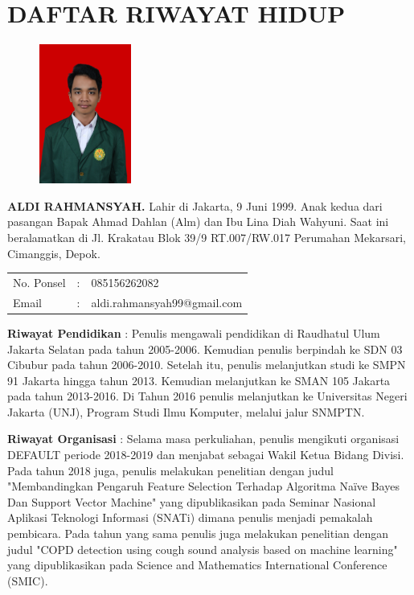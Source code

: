 \pagestyle{empty}
\chapter*{\centering \large DAFTAR RIWAYAT HIDUP}
\thispagestyle{empty}

\begin{figure}
	\vspace{-25pt}
	\begin{center}
		\includegraphics[width=0.27\textwidth]{gambar/12}
	\end{center}
	\vspace{-80pt}
\end{figure}

\noindent \textbf{ALDI RAHMANSYAH.}  Lahir di Jakarta, 9 Juni 1999.  Anak kedua dari pasangan Bapak Ahmad Dahlan (Alm) dan Ibu Lina Diah Wahyuni. Saat ini beralamatkan di Jl. Krakatau Blok 39/9 RT.007/RW.017 Perumahan Mekarsari, Cimanggis, Depok.

\vspace{0.5cm}
\noindent
\begin{center}
	\begin{flushright}
		\begin{tabular}{lcl}
			No. Ponsel	& :&  085156262082 \\
			Email	& :&  aldi.rahmansyah99@gmail.com
		\end{tabular}
	\end{flushright}
\end{center}
\vspace{0.5cm}

\noindent \textbf{Riwayat Pendidikan} : Penulis mengawali pendidikan di Raudhatul Ulum Jakarta Selatan pada tahun 2005-2006. Kemudian penulis berpindah ke SDN 03 Cibubur pada tahun 2006-2010. Setelah itu, penulis melanjutkan studi ke SMPN 91 Jakarta hingga tahun 2013. Kemudian melanjutkan ke SMAN 105 Jakarta pada tahun 2013-2016. Di Tahun 2016 penulis melanjutkan ke Universitas Negeri Jakarta (UNJ), Program Studi Ilmu Komputer, melalui jalur SNMPTN.

\noindent \textbf{Riwayat Organisasi} : Selama masa perkuliahan, penulis mengikuti organisasi DEFAULT periode 2018-2019 dan menjabat sebagai Wakil Ketua Bidang Divisi. Pada tahun 2018 juga, penulis melakukan penelitian dengan judul "Membandingkan Pengaruh Feature Selection Terhadap Algoritma Naïve Bayes Dan Support Vector Machine" yang dipublikasikan pada Seminar Nasional Aplikasi Teknologi Informasi (SNATi) dimana penulis menjadi pemakalah pembicara. Pada tahun yang sama penulis juga melakukan penelitian dengan judul "COPD detection 
using cough sound analysis based on machine learning" yang dipublikasikan pada Science and Mathematics International Conference (SMIC).